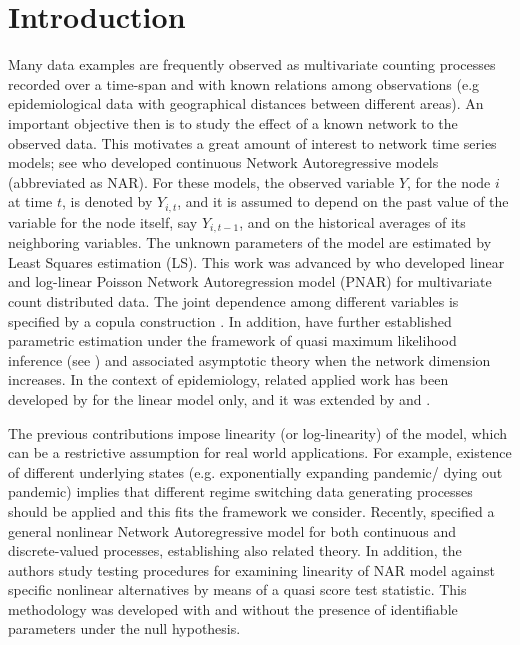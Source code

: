 \section{Introduction}
\label{sec:Introduction}

Many data examples   are frequently observed as  multivariate   counting processes recorded over a time-span and with known relations among  observations (e.g epidemiological data with geographical distances between different areas). 
An important  objective   then  is to study  the effect of a  known network to the observed data. 
This  motivates a great amount of  interest to  network  time series models; see 
\cite{zhu2017}  who developed continuous  Network Autoregressive models (abbreviated as NAR). 
For these models,  the observed  variable $Y$, for the node $i$ at time $t$, is denoted by $Y_{i,t}$, and it is assumed to depend   on the past value of the variable for the node itself,  say $Y_{i,t-1}$, 
and on the historical averages of its neighboring variables. The unknown parameters of the model are estimated by Least Squares estimation (LS). This work was advanced  by 
\cite{armillotta_fokianos_2021} who developed  linear and  
log-linear Poisson Network Autoregression model (PNAR) for multivariate count  distributed data. 
The joint dependence among different variables is specified by a copula construction \cite[Sec.~2]{fok2020}. In addition,  
\cite{armillotta_fokianos_2021} have further established 
parametric estimation under the framework of quasi maximum likelihood inference (see \cite{wedderburn1974quasi}  \cite{gourieroux1984pseudo}) and associated asymptotic theory when the network dimension increases. In the context of epidemiology,  
related applied work has been developed  by \cite{held_etal_2005} for the linear model only,  and it was  extended by \cite{paul_etal_2008,paul_etal_2011,held_etal_2012,Meyer_etal_2014} and \cite{bracher_2020endemic}.



The previous contributions impose  linearity (or log-linearity) of the model,
which can be  a restrictive assumption for real world applications.  For example, 
existence of different underlying states  (e.g. exponentially expanding pandemic/ dying out pandemic)  implies that  different regime switching data generating processes should  be applied  and this fits the framework
we consider. Recently,  \cite{armillotta_fokianos_2022_testing} specified a general nonlinear Network Autoregressive model for both continuous and discrete-valued processes, establishing also related theory. In addition, the authors study  testing procedures for examining linearity of NAR model against specific nonlinear alternatives by means of a quasi score test statistic.
This methodology was developed  with and without the presence of  identifiable parameters under the null hypothesis.


